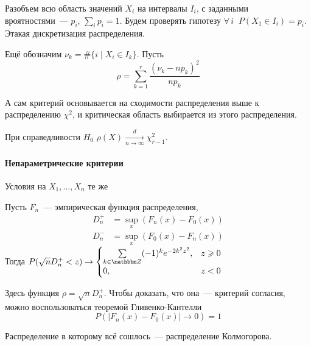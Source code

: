 \documentclass[12pt,timbord]{../../../notes}
\begin{document}
\begin{defn}\label{defn:stat::pirson::crit}
  Разобъем всю область значений $X_i$ на интервалы $I_i$,
  с заданными вроятностями~--- $p_i$, $\sum_i p_i = 1$.
  Будем проверять гипотезу $\forall\, i\;\; P(X_1 \in I_i) = p_i$. Этакая дискретизация распределения.

  Ещё обозначим $\nu_k = \# \{i \mid X_i \in I_k\}$. Пусть
  \[
    \rho = \sum_{k=1}^r \frac{( \nu_k - np_k )^2}{n p_k} 
  \]

  А сам критерий основывается на сходимости распределения выше к распределению $\chi^2$, и
  критическая область выбирается из этого распределения.
\end{defn}

\begin{thrm}\label{thrm:stat::pirson::chi}
  При справедливости $H_0$ $\rho(X) \xrightarrow[n\to \infty]{d} \chi_{r-1}^2$.
\end{thrm}

\paragraph{Непараметрические критерии}
\label{par:stat::nonparcrit}
Условия на $X_1, \dotsc, X_n$ те же

\begin{prop}\label{prop:stat::nonparcrit::kolm}
  Пусть $F_n$~--- эмпирическая функция распределения, 
  \begin{align*}
    D_n^+ &= \sup_x (F_n(x) - F_0(x)) \\
    D_n^- &= \sup_x (F_0(x) - F_n(x)) 
  \end{align*}
  Тогда $P(\sqrt n D_n^+  < z) \to \displaystyle\begin{cases}
    \sum\limits_{k\in \Z} (-1)^k e^{-2k^2 z^2}, &z \geqslant 0 \\
    0, &z < 0 \\
  \end{cases}$

  Здесь функция $\rho = \sqrt n D_n^+$. 
  Чтобы доказать, что она~--- критерий согласия, можно
  воспользоваться теоремой Гливенко-Кантелли
  \[
    P(|F_n(x) - F_0(x) | \to 0 ) = 1
  \]

  Распределение в которому всё сошлось~--- распределение Колмогорова.
\end{prop}
\end{document}
